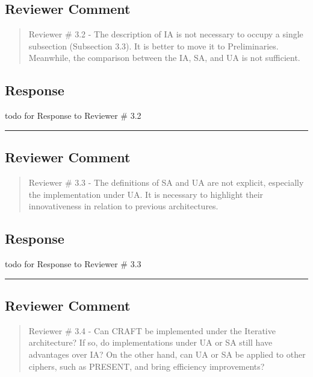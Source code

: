 \subsection{Reviewer Comment}
\begin{mdframed}
	\begin{quote}
		Reviewer \# 3.2 - The description of IA is not necessary to occupy a single subsection (Subsection 3.3). It is better to move it to Preliminaries. Meanwhile, the comparison between the IA, SA, and UA is not sufficient.
	\end{quote}
\end{mdframed}

\subsection{Response}

todo for Response to Reviewer \# 3.2


\noindent\rule{\linewidth}{2.0pt}

\subsection{Reviewer Comment}
\begin{mdframed}
	\begin{quote}
		Reviewer \# 3.3 - The definitions of SA and UA are not explicit, especially the implementation under UA. It is necessary to highlight their innovativeness in relation to previous architectures.
	\end{quote}
\end{mdframed}

\subsection{Response}

todo for Response to Reviewer \# 3.3


\noindent\rule{\linewidth}{2.0pt}

\subsection{Reviewer Comment}
\begin{mdframed}
	\begin{quote}
		Reviewer \# 3.4 - Can CRAFT be implemented under the Iterative architecture? If so, do implementations under UA or SA still have advantages over IA? On the other hand, can UA or SA be applied to other ciphers, such as PRESENT, and bring efficiency improvements?
	\end{quote}
\end{mdframed}

